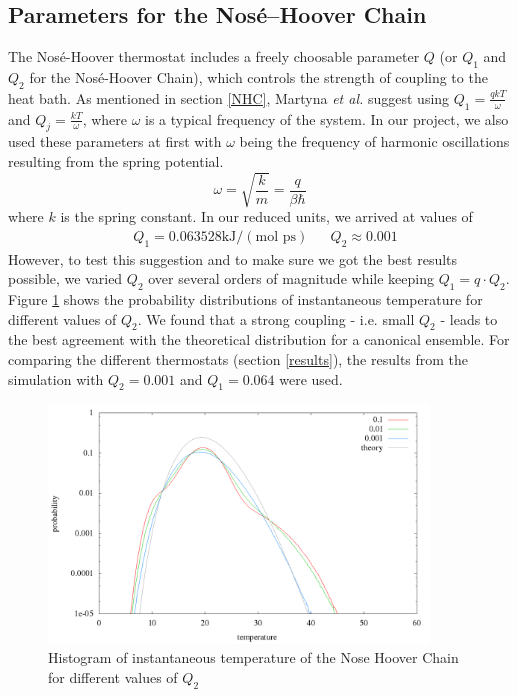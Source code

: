 \subsection{Parameters for the Nosé--Hoover Chain}
The Nosé-Hoover thermostat includes a freely choosable parameter $Q$ (or $Q_1$ and $Q_2$ for the Nosé-Hoover Chain), which controls the strength of coupling to the heat bath. As mentioned in section \ref{NHC}, Martyna \textit{et al.} \cite{Martyna1992} suggest using $Q_1 = \frac{qkT}{\omega}$ and $Q_j = \frac{kT}{\omega}$, where $\omega$ is a typical frequency of the system. In our project, we also used these parameters at first with $\omega$ being the frequency of harmonic oscillations resulting from the spring potential.
\begin{equation}
\omega = \sqrt{\frac{k}{m}} = \frac{q}{\beta \hbar}
\end{equation} 
where $k$ is the spring constant. In our reduced units, we arrived at values of 
\begin{align*}
& Q_1 = 0.063528 \text{kJ}/(\text{mol ps}) && Q_2 \approx 0.001
\end{align*} 
However, to test this suggestion and to make sure we got the best results possible, we varied $Q_2$ over several orders of magnitude while keeping $Q_1 = q\cdot Q_2$. Figure \ref{im:temp_chain} shows the probability distributions of instantaneous temperature for different values of $Q_2$. We found that a strong coupling - i.e. small $Q_2$ - leads to the best agreement with the theoretical distribution for a canonical ensemble. For comparing the different thermostats (section \ref{results}), the results from the simulation with $Q_2 = 0.001$ and $Q_1 = 0.064$ were used. 

\begin{figure}[H]
\centering
\includegraphics[width=0.9\textwidth]{./graphics/Histogramm_tempCol_one_Chain.png}
\caption{Histogram of instantaneous temperature of the Nose Hoover Chain for different values of $Q_2$ }
\label{im:temp_chain}
\end{figure}



